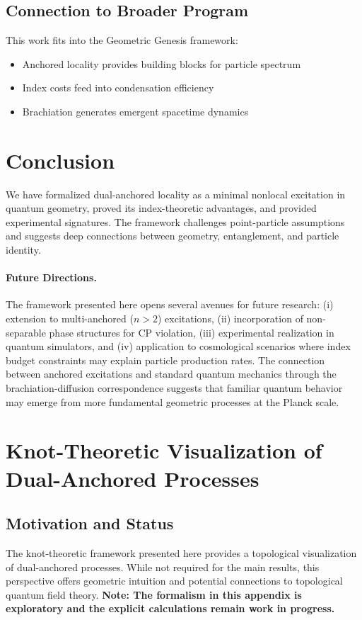 \documentclass[11pt]{article}
\theoremstyle{plain}
\theoremstyle{definition}
\begin{document}
\subsection{Connection to Broader Program}
This work fits into the Geometric Genesis framework:
\begin{itemize}
  \item Anchored locality provides building blocks for particle spectrum
  \item Index costs feed into condensation efficiency
  \item Brachiation generates emergent spacetime dynamics
\end{itemize}

\section{Conclusion}
We have formalized dual-anchored locality as a minimal nonlocal excitation in quantum geometry, proved its index-theoretic advantages, and provided experimental signatures. The framework challenges point-particle assumptions and suggests deep connections between geometry, entanglement, and particle identity.

\paragraph{Future Directions.}
The framework presented here opens several avenues for future research: (i) extension to multi-anchored ($n>2$) excitations, (ii) incorporation of non-separable phase structures for CP violation, (iii) experimental realization in quantum simulators, and (iv) application to cosmological scenarios where index budget constraints may explain particle production rates. The connection between anchored excitations and standard quantum mechanics through the brachiation-diffusion correspondence suggests that familiar quantum behavior may emerge from more fundamental geometric processes at the Planck scale.

\appendix

\section{Knot-Theoretic Visualization of Dual-Anchored Processes}
\label{app:knot-unified}

\subsection{Motivation and Status}
The knot-theoretic framework presented here provides a topological visualization of dual-anchored processes. While not required for the main results, this perspective offers geometric intuition and potential connections to topological quantum field theory. \textbf{Note: The formalism in this appendix is exploratory and the explicit calculations remain work in progress.}
\end{document}
